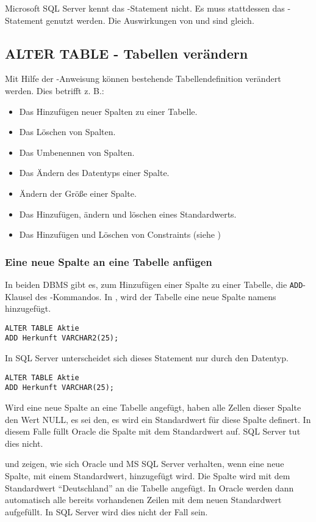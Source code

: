 \begin{merke}
    Microsoft SQL Server kennt das -Statement nicht. Es muss stattdessen das -Statement genutzt werden. Die Auswirkungen von  und  sind gleich.
\end{merke}
\subsection{ALTER TABLE - Tabellen verändern}
Mit Hilfe der -Anweisung können bestehende Tabellendefinition verändert werden. Dies betrifft z. B.:
\begin{itemize}
    \item Das Hinzufügen neuer Spalten zu einer Tabelle.
    \item Das Löschen von Spalten.
    \item Das Umbenennen von Spalten.
    \item Das Ändern des Datentyps einer Spalte.
    \item Ändern der Größe einer Spalte.
    \item Das Hinzufügen, ändern und löschen eines Standardwerts.
    \item Das Hinzufügen und Löschen von Constraints (siehe )
\end{itemize}
\subsubsection{Eine neue Spalte an eine Tabelle anfügen}
In beiden DBMS gibt es, zum Hinzufügen einer Spalte zu einer Tabelle, die \lstinline{ADD}-Klausel des -Kommandos. In , wird der Tabelle  eine neue Spalte namens  hinzugefügt.
\begin{lstlisting}[language=oracle_sql,caption={Oracle - Tabellenspalte hinzufügen},label=sql08_07]
ALTER TABLE Aktie
ADD Herkunft VARCHAR2(25);
          \end{lstlisting}
In SQL Server unterscheidet sich dieses Statement nur durch den Datentyp.
\clearpage
\begin{lstlisting}[language=ms_sql,caption={MS SQL Server - Tabellenspalte hinzufügen},label=sql08_08]
ALTER TABLE Aktie
ADD Herkunft VARCHAR(25);
          \end{lstlisting}
\begin{merke}
    Wird eine neue Spalte an eine Tabelle angefügt, haben alle Zellen dieser Spalte den Wert NULL, es sei den, es wird ein Standardwert für diese Spalte definert. In diesem Falle füllt Oracle die Spalte mit dem Standardwert auf. SQL Server tut dies nicht.
\end{merke}
 und  zeigen, wie sich Oracle und MS SQL Server verhalten, wenn eine neue Spalte, mit einem Standardwert, hinzugefügt wird. Die Spalte  wird mit dem Standardwert \enquote{Deutschland} an die Tabelle  angefügt. In Oracle werden dann automatisch alle bereits vorhandenen Zeilen mit dem neuen Standardwert aufgefüllt. In SQL Server wird dies nicht der Fall sein.


